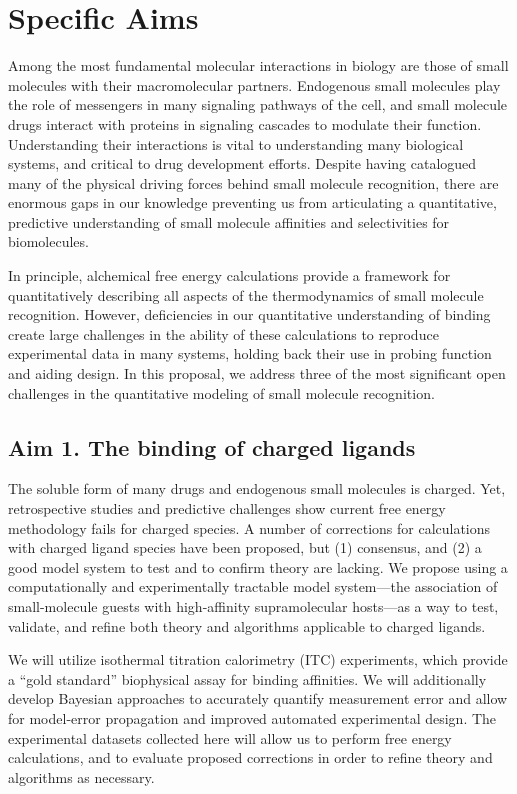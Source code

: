 \documentclass[10pt]{article}
\date{}
\begin{document}
\section*{Specific Aims}
Among the most fundamental molecular interactions in biology are those of small molecules with their macromolecular partners.
Endogenous small molecules play the role of messengers in many signaling pathways of the cell, and small molecule drugs interact with proteins in signaling cascades to modulate their function.
Understanding their interactions is vital to understanding many biological systems, and critical to drug development efforts. 
Despite having catalogued many of the physical driving forces behind small molecule recognition, there are enormous gaps in our knowledge preventing us from articulating a quantitative, predictive understanding of small molecule affinities and selectivities for biomolecules.

In principle, alchemical free energy calculations provide a framework for quantitatively describing all aspects of the thermodynamics of small molecule recognition. However, deficiencies in our quantitative understanding of binding create large challenges in the ability of these calculations to reproduce experimental data in many systems, holding back their use in probing function and aiding design.
In this proposal, we address three of the most significant open challenges in the quantitative modeling of small molecule recognition.


\subsection*{Aim 1. The binding of charged ligands}
The soluble form of many drugs and endogenous small molecules is charged. 
Yet, retrospective studies and predictive challenges show current free energy methodology fails for charged species. 
A number of corrections for calculations with charged ligand species have been proposed, but (1) consensus, and (2) a good model system to test and to confirm theory are lacking. 
We propose using a computationally and experimentally tractable model system---the association of small-molecule guests with high-affinity supramolecular hosts---as a way to test, validate, and refine both theory and algorithms applicable to charged ligands.

We will utilize isothermal titration calorimetry (ITC) experiments, which provide a “gold standard” biophysical assay for binding affinities. 
We will additionally develop Bayesian approaches to accurately quantify measurement error and allow for model-error propagation and improved automated experimental design. 
The experimental datasets collected here will allow us to perform free energy calculations, and to evaluate proposed corrections in order to refine theory and algorithms as necessary. 
\end{document}
